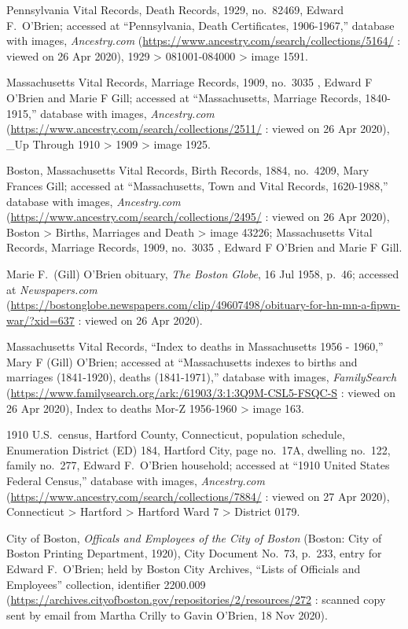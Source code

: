 \begin{thebibliography}{999}
Pennsylvania Vital Records, Death Records, 1929, no.\ 82469, Edward F.\ O'Brien; accessed at ``Pennsylvania, Death Certificates, 1906-1967,'' database with images, \textit{Ancestry.com} (\url{https://www.ancestry.com/search/collections/5164/} : viewed on 26 Apr 2020), 1929 > 081001-084000 > image 1591.

Massachusetts Vital Records, Marriage Records, 1909, no.\ 3035 , Edward F O'Brien and Marie F Gill; accessed at ``Massachusetts, Marriage Records, 1840-1915,'' database with images, \textit{Ancestry.com} (\url{https://www.ancestry.com/search/collections/2511/} : viewed on 26 Apr 2020), \_Up Through 1910 > 1909 > image 1925.

Boston, Massachusetts Vital Records, Birth Records, 1884, no.\ 4209, Mary Frances Gill; accessed at ``Massachusetts, Town and Vital Records, 1620-1988,'' database with images, \textit{Ancestry.com} (\url{https://www.ancestry.com/search/collections/2495/} : viewed on 26 Apr 2020), Boston > Births, Marriages and Death > image 43226; Massachusetts Vital Records, Marriage Records, 1909, no.\ 3035 , Edward F O'Brien and Marie F Gill.

Marie F.\ (Gill) O'Brien obituary, \textit{The Boston Globe}, 16 Jul 1958, p.\ 46; accessed at \textit{Newspapers.com} (\url{https://bostonglobe.newspapers.com/clip/49607498/obituary-for-hn-mn-a-fipwn-war/?xid=637} : viewed on 26 Apr 2020).

Massachusetts Vital Records, ``Index to deaths in Massachusetts 1956 - 1960,'' Mary F (Gill) O'Brien; accessed at ``Massachusetts indexes to births and marriages (1841-1920), deaths (1841-1971),'' database with images, \textit{FamilySearch} (\url{https://www.familysearch.org/ark:/61903/3:1:3Q9M-CSL5-FSQC-S} : viewed on 26 Apr 2020), Index to deaths Mor-Z 1956-1960 > image 163.

1910 U.S.\ census, Hartford County, Connecticut, population schedule, Enumeration District (ED) 184, Hartford City, page no.\ 17A, dwelling no.\ 122, family no.\ 277, Edward F.\ O'Brien household; accessed at ``1910 United States Federal Census,'' database with images, \textit{Ancestry.com} (\url{https://www.ancestry.com/search/collections/7884/} : viewed on 27 Apr 2020), Connecticut > Hartford > Hartford Ward 7 > District 0179.

City of Boston, \textit{Officals and Employees of the City of Boston} (Boston: City of Boston Printing Department, 1920), City Document No.\ 73, p.\ 233, 
entry for Edward F.\ O'Brien; held by Boston City Archives, ``Lists of Officials and Employees'' collection, identifier 2200.009 (\url{https://archives.cityofboston.gov/repositories/2/resources/272} : scanned copy sent by email from Martha Crilly to Gavin O'Brien, 18 Nov 2020).


\end{thebibliography}
